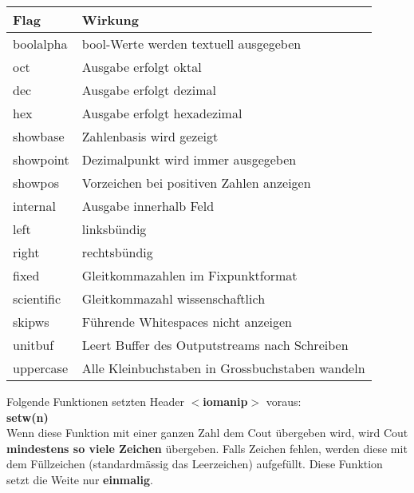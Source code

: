 \begin{center}
    \begin{tabular}{ll}
        \rowcolor[RGB]{239,239,239} 
        \textbf{Flag} & \textbf{Wirkung}                                        \\ \hline
        boolalpha     & bool-Werte werden textuell ausgegeben                   \\
        oct           & Ausgabe erfolgt oktal                                   \\
        dec           & Ausgabe erfolgt dezimal                                 \\
        hex           & Ausgabe erfolgt hexadezimal                             \\
        showbase      & Zahlenbasis wird gezeigt                                \\
        showpoint     & Dezimalpunkt wird immer ausgegeben                      \\
        showpos       & Vorzeichen bei positiven Zahlen anzeigen                \\
        internal      & Ausgabe innerhalb Feld                                  \\
        left          & linksbündig                                             \\
        right         & rechtsbündig                                            \\
        fixed         & Gleitkommazahlen im Fixpunktformat                      \\
        scientific    & Gleitkommazahl wissenschaftlich                         \\
        skipws        & Führende Whitespaces nicht anzeigen                     \\
        unitbuf       & Leert Buffer des Outputstreams nach Schreiben           \\
        uppercase     & Alle Kleinbuchstaben in Grossbuchstaben wandeln
    \end{tabular}
\end{center}

Folgende Funktionen setzten Header \textbf{$<$iomanip$>$} voraus:\\

\textbf{setw(n)}\\

Wenn diese Funktion mit einer ganzen Zahl dem Cout übergeben wird, wird Cout \textbf{mindestens so viele Zeichen} übergeben. 
Falls Zeichen fehlen, werden diese mit dem Füllzeichen (standardmässig das Leerzeichen) aufgefüllt. 
Diese Funktion setzt die Weite nur \textbf{einmalig}.\\

